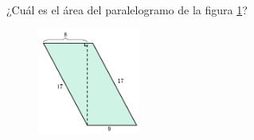 ¿Cuál es el \'area del paralelogramo de la figura \ref{fig:area_compuesta_01}?
\begin{figure}[H]
    \begin{center}
        \includegraphics[width=0.3\textwidth]{../images/area_compuesta_01.png}
    \end{center}
    \caption{}
    \label{fig:area_compuesta_01}
\end{figure}